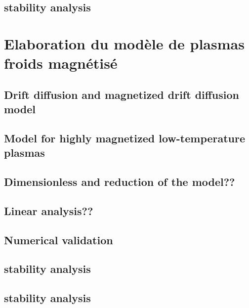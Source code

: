 		\subsection{stability analysis}
	\section{Elaboration du modèle de plasmas froids magnétisé}
		\subsection{Drift diffusion and magnetized drift diffusion model}
		\subsection{Model for highly magnetized low-temperature plasmas}
		\subsection{Dimensionless and reduction of the model??}
		\subsection{Linear analysis??}
		\subsection{Numerical validation}
		\subsection{stability analysis}
		\subsection{stability analysis}
